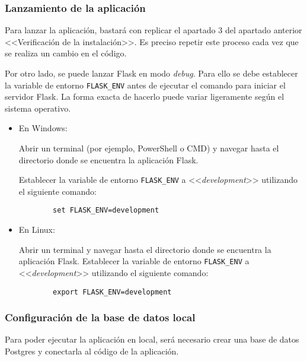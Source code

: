 \subsubsection{Lanzamiento de la aplicación}

Para lanzar la aplicación, bastará con replicar el apartado 3 del apartado anterior <<Verificación de la instalación>>. Es preciso repetir este proceso cada vez que se realiza un cambio en el código.

Por otro lado, se puede lanzar Flask en modo \textit{debug}. Para ello se debe establecer la variable de entorno \texttt{FLASK\_ENV} antes de ejecutar el comando para iniciar el servidor Flask. La forma exacta de hacerlo puede variar ligeramente según el sistema operativo.
\begin{itemize}
    \item En Windows:
    
        Abrir un terminal (por ejemplo, PowerShell o CMD) y navegar hasta el directorio donde se encuentra la aplicación Flask.
    
        Establecer la variable de entorno \texttt{FLASK\_ENV} a <<\textit{development}>> utilizando el siguiente comando:
    
        \begin{verbatim}
        set FLASK_ENV=development
        \end{verbatim}
        
    \item En Linux:
    
        Abrir un terminal y navegar hasta el directorio donde se encuentra la aplicación Flask.
        Establecer la variable de entorno \texttt{FLASK\_ENV} a <<\textit{development}>> utilizando el siguiente comando:
    
        \begin{verbatim}
        export FLASK_ENV=development
        \end{verbatim}
\end{itemize}

\subsubsection{Configuración de la base de datos local}
Para poder ejecutar la aplicación en local, será necesario crear una base de datos Postgres y conectarla al código de la aplicación.


